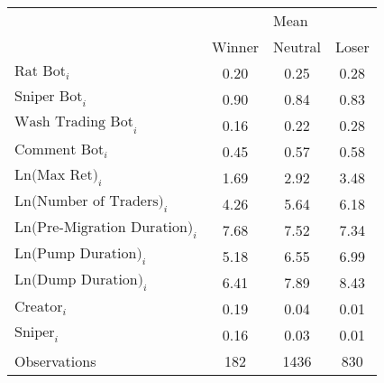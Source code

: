 \begin{tabular}{lccc}
\toprule
& \multicolumn{3}{c}{Mean} \\
\cmidrule{2-4}
& Winner & Neutral & Loser \\
\midrule
$\text{Rat Bot}_{i}$ & 0.20 & 0.25 & 0.28 \\
$\text{Sniper Bot}_{i}$ & 0.90 & 0.84 & 0.83 \\
$\text{Wash Trading Bot}_{i}$ & 0.16 & 0.22 & 0.28 \\
$\text{Comment Bot}_{i}$ & 0.45 & 0.57 & 0.58 \\
$\text{Ln(Max Ret)}_{i}$ & 1.69 & 2.92 & 3.48 \\
$\text{Ln(Number of Traders)}_{i}$ & 4.26 & 5.64 & 6.18 \\
$\text{Ln(Pre-Migration Duration)}_{i}$ & 7.68 & 7.52 & 7.34 \\
$\text{Ln(Pump Duration)}_{i}$ & 5.18 & 6.55 & 6.99 \\
$\text{Ln(Dump Duration)}_{i}$ & 6.41 & 7.89 & 8.43 \\
$\text{Creator}_{i}$ & 0.19 & 0.04 & 0.01 \\
$\text{Sniper}_{i}$ & 0.16 & 0.03 & 0.01 \\
\midrule
Observations & 182 & 1436 & 830 \\
\bottomrule
\end{tabular}
